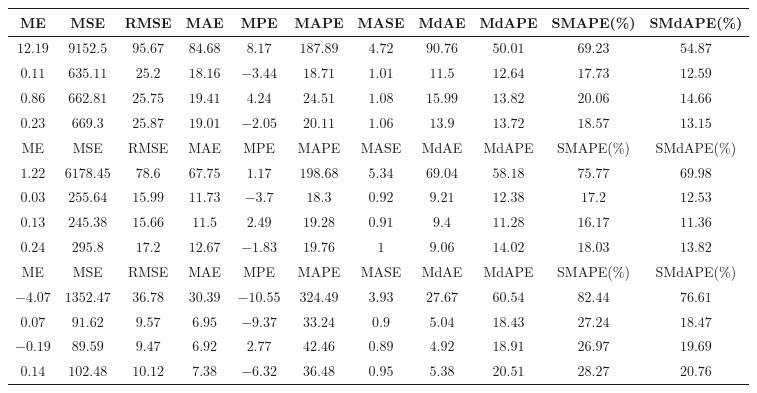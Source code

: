\begin{table}
{\scriptsize
\centering
\begin{tabular}{|c|c|c|c|c|c|c|c|c|c|c|}
\hline
ME &MSE &RMSE &MAE &MPE &MAPE &MASE &MdAE &MdAPE & SMAPE(\%) & SMdAPE(\%) \\
\hline
$12.19$ & $9152.5$ & $95.67$ & $84.68$ & $8.17$ & $187.89$ & $4.72$ & $90.76$ & $50.01$ & $69.23$ & $54.87$ \\
\bf{$0.11$} & \bf{$635.11$} & \bf{$25.2$} & \bf{$18.16$} & \bf{$-3.44$} & \bf{$18.71$} & \bf{$1.01$} & \bf{$11.5$} & \bf{$12.64$} & \bf{$17.73$} & \bf{$12.59$} \\
$0.86$ & $662.81$ & $25.75$ & $19.41$ & $4.24$ & $24.51$ & $1.08$ & $15.99$ & $13.82$ & $20.06$ & $14.66$ \\
$0.23$ & $669.3$ & $25.87$ & $19.01$ & $-2.05$ & $20.11$ & $1.06$ & $13.9$ & $13.72$ & $18.57$ & $13.15$ \\

ME &MSE &RMSE &MAE &MPE &MAPE &MASE &MdAE &MdAPE & SMAPE(\%) & SMdAPE(\%) \\
$1.22$ & $6178.45$ & $78.6$ & $67.75$ & $1.17$ & $198.68$ & $5.34$ & $69.04$ & $58.18$ & $75.77$ & $69.98$ \\
\bf{$0.03$} & $255.64$ & $15.99$ & $11.73$ & \bf{$-3.7$} & \bf{$18.3$} & $0.92$ & $9.21$ & $12.38$ & $17.2$ & $12.53$ \\
$0.13$ & \bf{$245.38$} & \bf{$15.66$} & \bf{$11.5$} & $2.49$ & $19.28$ & \bf{$0.91$} & $9.4$ & \bf{$11.28$} & \bf{$16.17$} & \bf{$11.36$} \\
$0.24$ & $295.8$ & $17.2$ & $12.67$ & $-1.83$ & $19.76$ & $1$ & \bf{$9.06$} & $14.02$ & $18.03$ & $13.82$ \\

ME &MSE &RMSE &MAE &MPE &MAPE &MASE &MdAE &MdAPE & SMAPE(\%) & SMdAPE(\%) \\
\bf{$-4.07$} & $1352.47$ & $36.78$ & $30.39$ & \bf{$-10.55$} & $324.49$ & $3.93$ & $27.67$ & $60.54$ & $82.44$ & $76.61$ \\
$0.07$ & $91.62$ & $9.57$ & $6.95$ & $-9.37$ & \bf{$33.24$} & $0.9$ & $5.04$ & \bf{$18.43$} & $27.24$ & \bf{$18.47$} \\
$-0.19$ & \bf{$89.59$} & \bf{$9.47$} & \bf{$6.92$} & $2.77$ & $42.46$ & \bf{$0.89$} & \bf{$4.92$} & $18.91$ & \bf{$26.97$} & $19.69$ \\
$0.14$ & $102.48$ & $10.12$ & $7.38$ & $-6.32$ & $36.48$ & $0.95$ & $5.38$ & $20.51$ & $28.27$ & $20.76$ \\


\end{tabular}}
\end{table}
